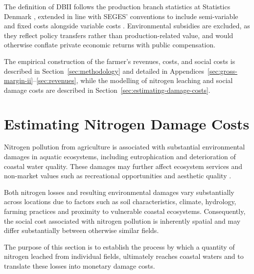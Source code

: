 \documentclass[12pt]{article}
\begin{document}
The definition of DBII follows the production branch statistics at 
Statistics Denmark \citep{dst2025a}, extended in line with SEGES' conventions 
to include semi-variable and fixed costs alongside variable costs 
\citep{seges2022}.
Environmental subsidies are excluded, as they 
reflect policy transfers rather than production-related value, and would otherwise conflate private economic returns with public compensation.

The empirical construction of the farmer's revenues, costs, and social costs is described in Section~\ref{sec:methodology} and detailed in 
Appendices~\ref{sec:gross-margin-ii}--\ref{sec:revenues}, while the modelling of nitrogen leaching and social damage costs are described in 
Section~\ref{sec:estimating-damage-costs}.

\section{Estimating Nitrogen Damage Costs}
\label{sec:est-nitrogen-damage-costs}

Nitrogen pollution from agriculture is associated with substantial environmental damages in aquatic ecosystems, including eutrophication and deterioration of coastal water quality. These damages may further affect ecosystem services and non-market values such as recreational opportunities and aesthetic quality \citep{Keeler2016,brink2011}.




Both nitrogen losses and resulting environmental damages vary substantially across locations due to factors such as soil characteristics, climate, hydrology, farming practices and proximity to vulnerable coastal ecosystems. Consequently, the social cost associated with nitrogen pollution is inherently spatial and may differ substantially between otherwise similar fields.



The purpose of this section is to establish the process by which a quantity of nitrogen leached from individual fields, ultimately reaches coastal waters and to translate these losses into monetary damage costs. %
\end{document}
